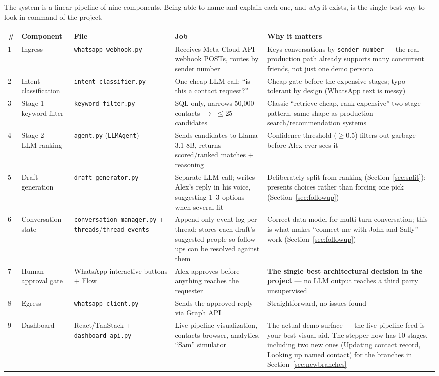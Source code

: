 \documentclass[11pt, a4paper]{article}
\begin{document}
The system is a linear pipeline of nine components. Being able to name and explain each one, and \emph{why} it exists, is the single best way to look in command of the project.

\begin{longtable}{@{}p{0.3cm}p{2.6cm}p{2.6cm}p{5.3cm}p{5.3cm}@{}}
\toprule
\# & Component & File & Job & Why it matters \\
\midrule
\endhead
1 & Ingress & \texttt{whatsapp\_webhook.py} & Receives Meta Cloud API webhook POSTs, routes by sender number & Keys conversations by \texttt{sender\_number} --- the real production path already supports many concurrent friends, not just one demo persona \\
2 & Intent classification & \texttt{intent\_classifier.py} & One cheap LLM call: ``is this a contact request?'' & Cheap gate before the expensive stages; typo-tolerant by design (WhatsApp text is messy) \\
3 & Stage 1 --- keyword filter & \texttt{keyword\_filter.py} & SQL-only, narrows 50{,}000 contacts $\to$ $\leq$25 candidates & Classic ``retrieve cheap, rank expensive'' two-stage pattern, same shape as production search/recommendation systems \\
4 & Stage 2 --- LLM ranking & \texttt{agent.py} (\texttt{LLMAgent}) & Sends candidates to Llama 3.1 8B, returns scored/ranked matches + reasoning & Confidence threshold ($\geq$0.5) filters out garbage before Alex ever sees it \\
5 & Draft generation & \texttt{draft\_generator.py} & Separate LLM call; writes Alex's reply in his voice, suggesting 1--3 options when several fit & Deliberately split from ranking (Section~\ref{sec:split}); presents choices rather than forcing one pick (Section~\ref{sec:followup}) \\
6 & Conversation state & \texttt{conversation\_manager.py} + \texttt{threads}/\texttt{thread\_events} & Append-only event log per thread; stores each draft's suggested people so follow-ups can be resolved against them & Correct data model for multi-turn conversation; this is what makes ``connect me with John and Sally'' work (Section~\ref{sec:followup}) \\
7 & Human approval gate & WhatsApp interactive buttons + Flow & Alex approves before anything reaches the requester & \textbf{The single best architectural decision in the project} --- no LLM output reaches a third party unsupervised \\
8 & Egress & \texttt{whatsapp\_client.py} & Sends the approved reply via Graph API & Straightforward, no issues found \\
9 & Dashboard & React/TanStack + \texttt{dashboard\_api.py} & Live pipeline visualization, contacts browser, analytics, ``Sam'' simulator & The actual demo surface --- the live pipeline feed is your best visual aid. The stepper now has 10 stages, including two new ones (Updating contact record, Looking up named contact) for the branches in Section~\ref{sec:newbranches} \\
\bottomrule
\end{longtable}
\end{document}
